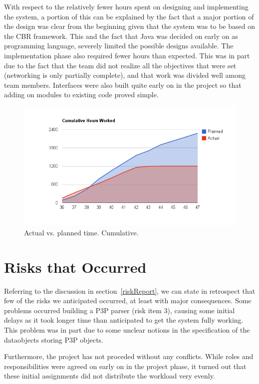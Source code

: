 With respect to the relatively fewer hours spent on designing and implementing the system, a portion of this can be explained by the fact that a major portion of the design was clear from the beginning given that the system was to be based on the CBR framework. This and the fact that Java was decided on early on as programming language, severely limited the possible designs available. The implementation phase also required fewer hours than expected. This was in part due to the fact that the team did not realize all the objectives that were set (networking is only partially complete), and that work was divided well among team members. Interfaces were also built quite early on in the project so that adding on modules to existing code proved simple.


\begin{centering}
  \begin{figure}
    \includegraphics[width = \textwidth]{Evaluation/actual_v_planned_cuml.png}
    \caption{Actual vs. planned time. Cumulative.}
    \label{actualPlannedCuml}
  \end{figure}
\end{centering}

\section{Risks that Occurred}

Referring to the discussion in section~\ref{riskReport}, we can state
in retrospect that few of the risks we anticipated occurred, at least
with major consequences. Some problems occurred building a P3P
parser (risk item 3), causing some initial delays as it took longer time than
anticipated to get the system fully working. This problem was in part
due to some unclear notions in the specification of the dataobjects
storing P3P objects.

Furthermore, the project has not proceded without any conflicts. While
roles and responsibilities were agreed on early on in the project
phase, it turned out that these initial assignments did not distribute the
workload very evenly. 
